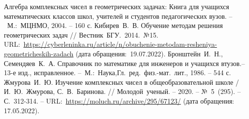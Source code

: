 \renewcommand\bibname{Список литературы}
\begin{thebibliography}{00}
     Алгебра комплексных чисел в геометрических задачах:
    Книга для учащихся математических классов школ, учителей и студентов педагогических вузов. --~М.:~МЦНМО,
    2004. -- 160 с.
     Кибирев~В.~В. Обучение методам решения геометрических задач // Вестник~БГУ.~2014.~№15. URL:~\href{https://cyberleninka.ru/article/n/obuchenie-metodam-resheniya-geometricheskih-zadach}{https://cyberleninka.ru/article/n/obuchenie-metodam-resheniya-geometricheskih-zadach} (дата обращения:~19.07.2022).
     Бронштейн~И.~Н., Семендяев~К.~А. Справочник по математике для инженеров и учащихся втузов.-- 13-е изд., исправленное. --~М.:~Наука,Гл.~ред.~физ.-мат.~лит., 1986. -- 544 с.
     Жмурова~И.~Ю. Изучение комплексных чисел в общеобразовательной школе / И.~Ю.~Жмурова, С.~В.~Баринова. // Молодой~ученый. -- 2020. -- №~5~(295). -- С.~312-314. -- URL:~\href{https://moluch.ru/archive/295/67123/}{https://moluch.ru/archive/295/67123/} (дата обращения: 17.05.2022).
\end{thebibliography}
